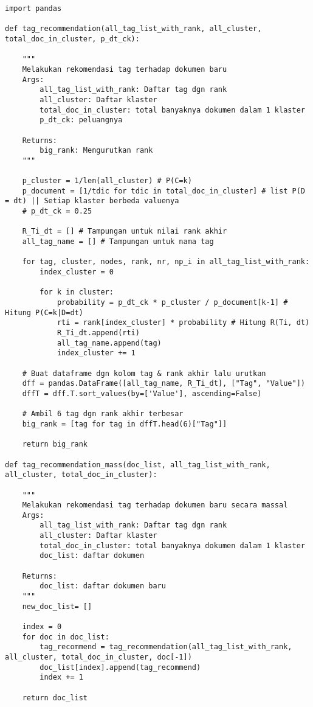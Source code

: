 \begin{lstlisting}[breaklines=true]
import pandas

def tag_recommendation(all_tag_list_with_rank, all_cluster, total_doc_in_cluster, p_dt_ck):

	"""
	Melakukan rekomendasi tag terhadap dokumen baru
	Args:
		all_tag_list_with_rank: Daftar tag dgn rank
		all_cluster: Daftar klaster
		total_doc_in_cluster: total banyaknya dokumen dalam 1 klaster
		p_dt_ck: peluangnya
		
	Returns:
		big_rank: Mengurutkan rank
	"""
	
	p_cluster = 1/len(all_cluster) # P(C=k)
	p_document = [1/tdic for tdic in total_doc_in_cluster] # list P(D = dt) || Setiap klaster berbeda valuenya
	# p_dt_ck = 0.25
	
	R_Ti_dt = [] # Tampungan untuk nilai rank akhir
	all_tag_name = [] # Tampungan untuk nama tag

	for tag, cluster, nodes, rank, nr, np_i in all_tag_list_with_rank:
		index_cluster = 0
		
		for k in cluster:
			probability = p_dt_ck * p_cluster / p_document[k-1] # Hitung P(C=k|D=dt)
			rti = rank[index_cluster] * probability # Hitung R(Ti, dt)
			R_Ti_dt.append(rti)
			all_tag_name.append(tag)
			index_cluster += 1

	# Buat dataframe dgn kolom tag & rank akhir lalu urutkan
	dff = pandas.DataFrame([all_tag_name, R_Ti_dt], ["Tag", "Value"])
	dffT = dff.T.sort_values(by=['Value'], ascending=False)

	# Ambil 6 tag dgn rank akhir terbesar
	big_rank = [tag for tag in dffT.head(6)["Tag"]]
	
	return big_rank

def tag_recommendation_mass(doc_list, all_tag_list_with_rank, all_cluster, total_doc_in_cluster):
	
	"""
	Melakukan rekomendasi tag terhadap dokumen baru secara massal
	Args:
		all_tag_list_with_rank: Daftar tag dgn rank
		all_cluster: Daftar klaster
		total_doc_in_cluster: total banyaknya dokumen dalam 1 klaster
		doc_list: daftar dokumen
		
	Returns:
		doc_list: daftar dokumen baru
	"""
	new_doc_list= []
	
	index = 0
	for doc in doc_list:
		tag_recommend = tag_recommendation(all_tag_list_with_rank, all_cluster, total_doc_in_cluster, doc[-1])
		doc_list[index].append(tag_recommend)
		index += 1
	
	return doc_list
	
\end{lstlisting}

